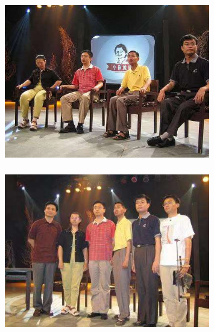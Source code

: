 \documentclass[cjk,slidestop,compress,mathserif,blue]{beamer}
\begin{document}
\frame
{
	\frametitle{}
\begin{figure}[h!]
\centering
\vspace{-0.05in}
\includegraphics[height=0.60\textwidth,width=0.8\textwidth,clip]{Figures/PekOpe_Cui-1.jpg}
\label{Cui-1}
\end{figure}
}

\frame
{
	\frametitle{}
\begin{figure}[h!]
\centering
\vspace{-0.05in}
\includegraphics[height=0.60\textwidth,width=0.8\textwidth,clip]{Figures/PekOpe_Cui-2.jpg}
\label{Cui-2}
\end{figure}
\fontsize{6.0pt}{5.2pt}
}
\end{document}
